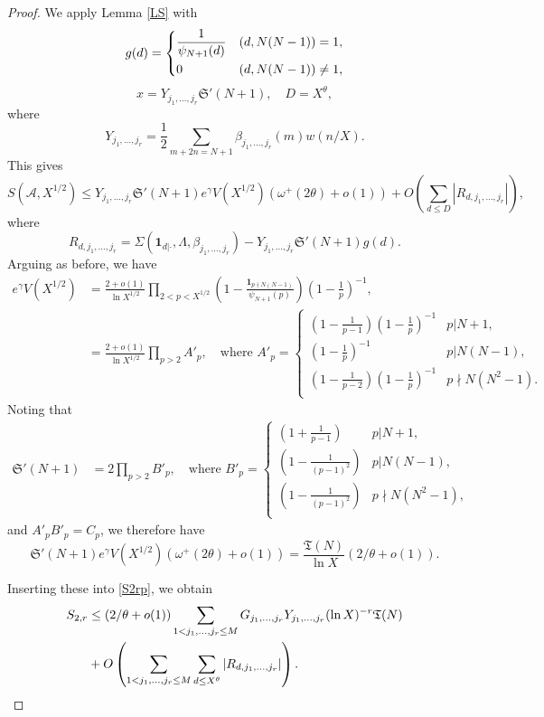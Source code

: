 \documentclass{amsart}
\theoremstyle{definition}
\theoremstyle{remark}
\newcommand{\1}{
    \bm{1}
}
\begin{document}
\begin{proof}
We apply Lemma \ref{LS} with 
\begin{align*} g(d) = 
\begin{dcases}
\frac{1}{\psi_{N+1}(d)} & (d,N(N-1)) = 1, \\
0 & (d,N(N-1)) \neq 1,
\end{dcases}
\end{align*}
\[ x = Y_{j_1,\ldots,j_r} \mathfrak{S}'(N+1), \quad D=X^{\theta}, \]
where
\[ Y_{j_1,\ldots,j_r} = \frac{1}{2} \sum_{m+2n=N+1} \beta_{j_1,\ldots,j_r}(m) w(n/X). \]
This gives
\[ S(\mathcal{A},X^{1/2}) \leq Y_{j_1,\ldots,j_r} \mathfrak{S}'(N+1) e^{\gamma} V(X^{1/2}) (\omega^{+}(2\theta)+o(1)) + O\left( \sum_{d \leq D} \left| R_{d,j_1,\ldots,j_r} \right| \right), \]
where
\[ R_{d,j_1,\ldots,j_r} = \Sigma(\1_{d|\cdot},\Lambda,\beta_{j_1,\ldots,j_r}) - Y_{j_1,\ldots,j_r}\mathfrak{S}'(N+1) g(d). \]
Arguing as before, we have
\begin{align*}
e^{\gamma} V(X^{1/2}) &= \frac{2+o(1)}{\ln{X^{1/2}}} \prod_{2<p < X^{1/2}} \left(1 - \frac{\1_{p\nmid N(N-1)}}{\psi_{N+1}(p)} \right) \left(1- \frac{1}{p} \right)^{-1}, \\
&= \frac{2+o(1)}{\ln{X^{1/2}}} \prod_{p>2} A'_p, \quad \text{where } A'_p=
\begin{cases}
\left(1 - \frac{1}{p-1} \right) \left(1- \frac{1}{p} \right)^{-1} & p|N+1, \\
\left(1- \frac{1}{p} \right)^{-1} & p|N(N-1), \\
\left(1 - \frac{1}{p-2} \right) \left(1- \frac{1}{p} \right)^{-1} & p\nmid N(N^2-1). \\
\end{cases}
\end{align*}
Noting that
\begin{align*}
\mathfrak{S}'(N+1) &= 2 \prod_{p>2} B'_p, \quad \text{where }
B'_p =
\begin{cases}
\left(1 + \frac{1}{p-1} \right) & p|N+1, \\
\left(1 - \frac{1}{(p-1)^2} \right) & p|N(N-1), \\
\left(1 - \frac{1}{(p-1)^2} \right) & p\nmid N(N^2-1), \\
\end{cases}
\end{align*}
and $A'_p B'_p = C_p$, we therefore have 
\[ \mathfrak{S}'(N+1) e^{\gamma} V(X^{1/2}) (\omega^{+}(2\theta)+o(1)) = \frac{\mathfrak{T}(N)}{\ln{X}} (2/\theta+o(1)). \]

Inserting these into \eqref{S2rp}, we obtain
\begin{align}
S_{2,r} &\leq (2/\theta+o(1)) \sum_{1<j_1,\ldots,j_r \leq M} G_{j_1,\ldots,j_r} Y_{j_1,\ldots,j_r} (\ln{X})^{-r} \mathfrak{T}(N) \notag \\
&+ O\left( \sum_{1<j_1,\ldots,j_r \leq M} \sum_{d \leq X^{\theta}} |R_{d,j_1,\ldots,j_r}| \right). \label{S2r} 
\end{align}




\end{proof}
\end{document}
